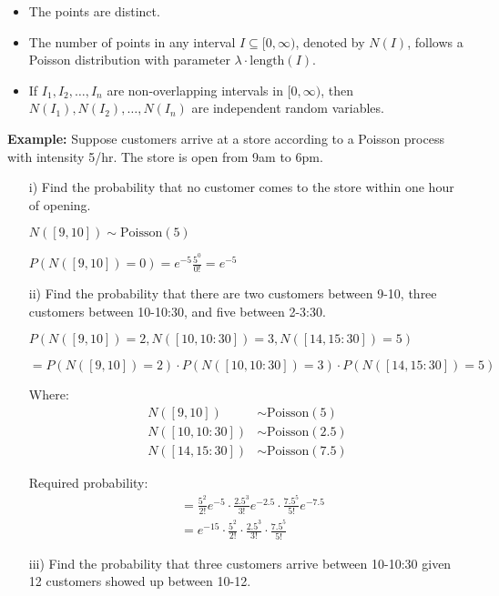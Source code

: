 \documentclass{article}
\begin{document}
   \begin{itemize}
     \item The points are distinct.
     \item The number of points in any interval $I \subseteq [0, \infty)$, denoted by $N(I)$, follows a Poisson distribution with parameter $\lambda \cdot \text{length}(I)$.
     \item If $I_1, I_2, \ldots, I_n$ are non-overlapping intervals in $[0, \infty)$, then $N(I_1), N(I_2), \ldots, N(I_n)$ are independent random variables.
   \end{itemize}

   \textbf{Example:} Suppose customers arrive at a store according to a Poisson process with intensity 5/hr. The store is open from 9am to 6pm.

   \begin{enumerate}
     \item[i)] Find the probability that no customer comes to the store within one hour of opening.
     
     $N([9, 10]) \sim \text{Poisson}(5)$
     
     $P(N([9, 10]) = 0) = e^{-5} \frac{5^0}{0!} = e^{-5}$

     \item[ii)] Find the probability that there are two customers between 9-10, three customers between 10-10:30, and five between 2-3:30.
     
     $P(N([9, 10]) = 2, N([10, 10:30]) = 3, N([14, 15:30]) = 5)$
     
     $= P(N([9, 10]) = 2) \cdot P(N([10, 10:30]) = 3) \cdot P(N([14, 15:30]) = 5)$
     
     Where:
     \begin{align*}
       N([9, 10]) &\sim \text{Poisson}(5) \\
       N([10, 10:30]) &\sim \text{Poisson}(2.5) \\
       N([14, 15:30]) &\sim \text{Poisson}(7.5)
     \end{align*}
     
     Required probability:
     \begin{align*}
       &= \frac{5^2}{2!} e^{-5} \cdot \frac{2.5^3}{3!} e^{-2.5} \cdot \frac{7.5^5}{5!} e^{-7.5} \\
       &= e^{-15} \cdot \frac{5^2}{2!} \cdot \frac{2.5^3}{3!} \cdot \frac{7.5^5}{5!}
     \end{align*}

     \item[iii)] Find the probability that three customers arrive between 10-10:30 given 12 customers showed up between 10-12.
     

\end{enumerate}
\end{document}
